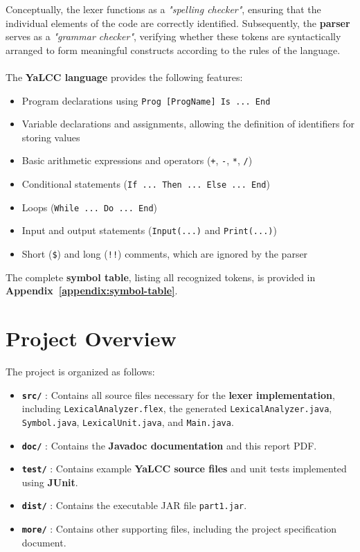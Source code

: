 \documentclass{article}
\begin{document}
\noindent Conceptually, the lexer functions as a \textit{"spelling checker"}, ensuring that the individual elements of the code are correctly identified. Subsequently, the \textbf{parser} serves as a \textit{"grammar checker"}, verifying whether these tokens are syntactically arranged to form meaningful constructs according to the rules of the language. \\ \\

\noindent The \textbf{YaLCC language} provides the following features:
\begin{itemize}
    \item Program declarations using \texttt{Prog [ProgName] Is ... End}
    \item Variable declarations and assignments, allowing the definition of identifiers for storing values
    \item Basic arithmetic expressions and operators (\texttt{+}, \texttt{-}, \texttt{*}, \texttt{/})
    \item Conditional statements (\texttt{If ... Then ... Else ... End})
    \item Loops (\texttt{While ... Do ... End})
    \item Input and output statements (\texttt{Input(...)} and \texttt{Print(...)})
    \item Short (\texttt{\$}) and long (\texttt{!!}) comments, which are ignored by the parser \\
\end{itemize}

\noindent The complete \textbf{symbol table}, listing all recognized tokens, is provided in \textbf{Appendix~\ref{appendix:symbol-table}}.


\section{Project Overview}

\noindent The project is organized as follows:

\begin{itemize}
    \item \textbf{\texttt{src/}} : Contains all source files necessary for the \textbf{lexer implementation}, including \texttt{LexicalAnalyzer.flex}, the generated \texttt{LexicalAnalyzer.java}, \texttt{Symbol.java}, \texttt{LexicalUnit.java}, and \texttt{Main.java}.
    \item \textbf{\texttt{doc/}} : Contains the \textbf{Javadoc documentation} and this report PDF.
    \item \textbf{\texttt{test/}} : Contains example \textbf{YaLCC source files} and unit tests implemented using \textbf{JUnit}.
    \item \textbf{\texttt{dist/}} : Contains the executable JAR file \texttt{part1.jar}.
    \item \textbf{\texttt{more/}} : Contains other supporting files, including the project specification document.
\end{itemize}
\end{document}
